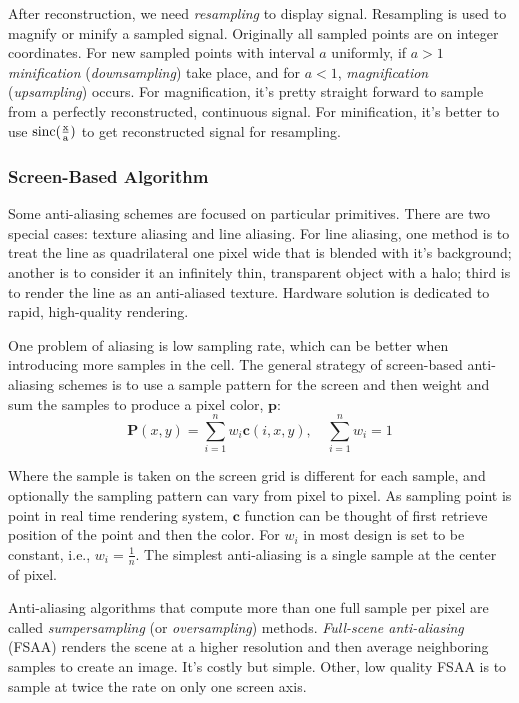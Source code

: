 \documentclass[10pt, a4paper]{article}
\begin{document}
            After reconstruction, we need \emph{resampling} to display signal. Resampling is used to magnify or minify a sampled signal. Originally all sampled points are on integer coordinates. For new sampled points with interval $a$ uniformly, if $a > 1$ \emph{minification} (\emph{downsampling}) take place, and for $a < 1$, \emph{magnification} (\emph{upsampling}) occurs. For magnification, it's pretty straight forward to sample from a perfectly reconstructed, continuous signal. For minification, it's better to use $\rm{sinc}(\frac{x}{a})$ to get reconstructed signal for resampling.

            \subsubsection{Screen-Based Algorithm}
                Some anti-aliasing schemes are focused on particular primitives. There are two special cases: texture aliasing and line aliasing. For line aliasing, one method is to treat the line as quadrilateral one pixel wide that is blended with it's background; another is to consider it an infinitely thin, transparent object with a halo; third is to render the line as an anti-aliased texture. Hardware solution is dedicated to rapid, high-quality rendering. 

                One problem of aliasing is low sampling rate, which can be better when introducing more samples in the cell. The general strategy of screen-based anti-aliasing schemes is to use a sample pattern for the screen and then weight and sum the samples to produce a pixel color, $\textbf{p}$: 
                    $$\textbf{P}(x, y) = \sum_{i = 1}^nw_i\textbf{c}(i,x,y),\quad \sum_{i = 1}^nw_i = 1$$
                
                    Where the sample is taken on the screen grid is different for each sample, and optionally the sampling pattern can vary from pixel to pixel. As sampling point is point in real time rendering system, $\textbf{c}$ function can be thought of first retrieve position of the point and then the color. For $w_i$ in most design is set to be constant, i.e., $w_i = \frac{1}{n}$. The simplest anti-aliasing is a single sample at the center of pixel. 

                    Anti-aliasing algorithms that compute more than one full sample per pixel are called \emph{sumpersampling} (or \emph{oversampling}) methods. \emph{Full-scene anti-aliasing} (FSAA) renders the scene at a higher resolution and then average neighboring samples to create an image. It's costly but simple. Other, low quality FSAA is to sample at twice the rate on only one screen axis. 
\end{document}
